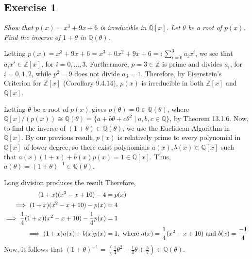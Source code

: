 \subsection*{Exercise 1}
\begin{framed}
\textit{Show that $p(x) = x^3 + 9x + 6$ is irreducible in $\mathbb{Q}[x]$. Let $\theta$ be a root of $p(x)$. Find the inverse of $1 + \theta$ in $\mathbb{Q}(\theta)$.}
\end{framed}

Letting $p(x) = x^3 + 9x + 6 = x^3 + 0x^2 + 9x + 6 =: \sum_{i=0}^3a_ix^i$, we see that $a_ix^i \in \mathbb{Z}[x]$, for $i = 0,...,3$. Furthermore, $p = 3 \in \mathbb{Z}$ is prime and divides $a_i$, for $i = 0, 1, 2$, while $p^2 = 9$ does not divide $a_3 = 1$. Therefore, by Eisenstein's Criterion for $\mathbb{Z}[x]$ (Corollary 9.4.14), $p(x)$ is irreducible in both $\mathbb{Z}[x]$ and $\mathbb{Q}[x]$.

Letting $\theta$ be a root of $p(x)$ gives $p(\theta) = 0 \in \mathbb{Q}(\theta)$, where $\mathbb{Q}[x]/(p(x)) \cong \mathbb{Q}(\theta) = \{a + b\theta + c\theta^2 \mid a, b, c \in \mathbb{Q}\}$, by Theorem 13.1.6. Now, to find the inverse of $(1 + \theta) \in \mathbb{Q}(\theta)$, we use the Euclidean Algorithm in $\mathbb{Q}[x]$. By our previous result, $p(x)$ is relatively prime to every polynomial in $\mathbb{Q}[x]$ of lower degree, so there exist polynomials $a(x), b(x) \in \mathbb{Q}[x]$ such that $a(x)(1 + x) + b(x)p(x) = 1 \in \mathbb{Q}[x]$. Thus, $a(\theta) = (1 + \theta)^{-1} \in \mathbb{Q}(\theta)$. 

Long division produces the result \hspace{5 mm} 
\newline
Therefore, 
\begin{align*}
    (1 + x)(x^2 - x + 10) - 4 &= p(x) \\
    \implies (1 + x)(x^2 - x + 10) - p(x) &= 4 \\
    \implies \frac{1}{4}(1 + x)(x^2 - x + 10) - \frac{1}{4}p(x) &= 1 \\
    \implies (1 + x)a(x) + b(x)p(x) &= 1, \textnormal{ where } a(x) = \frac{1}{4}(x^2 - x + 10) \textnormal{ and } b(x) = \frac{-1}{4}
\end{align*}
Now, it follows that $(1 + \theta)^{-1} = (\frac{1}{4}\theta^2 - \frac{1}{4}\theta + \frac{5}{2}) \in \mathbb{Q}(\theta).$